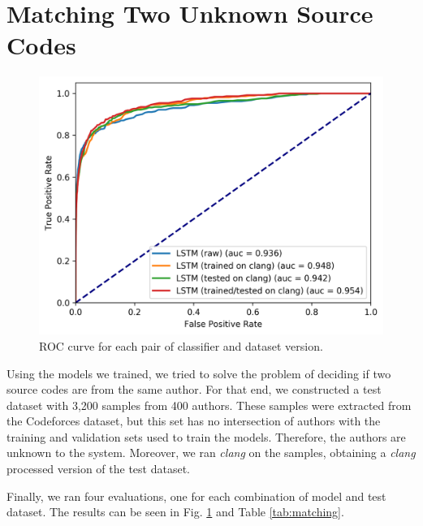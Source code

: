 \section{Matching Two Unknown Source Codes}\label{sec:matching}

\begin{figure}[ht]
	\centering
	\includegraphics[width=0.7\linewidth]{imgs/roc_complete.png}
	\caption{ROC curve for each pair of classifier and dataset version.}
	\label{fig:roc_complete}
\end{figure}

Using the models we trained, we tried to solve the problem of deciding if two source codes are from the same author. For that end, we constructed a test dataset with 3,200 samples from 400 authors. These samples were extracted from the Codeforces dataset, but this set has no intersection of authors with the training and validation sets used to train the models. Therefore, the authors are unknown to the system. Moreover, we ran \textit{clang} on the samples, obtaining a \textit{clang} processed version of the test dataset.

Finally, we ran four evaluations, one for each combination of model and test dataset. The results can be seen in Fig. \ref{fig:roc_complete} and  Table \ref{tab:matching}.

